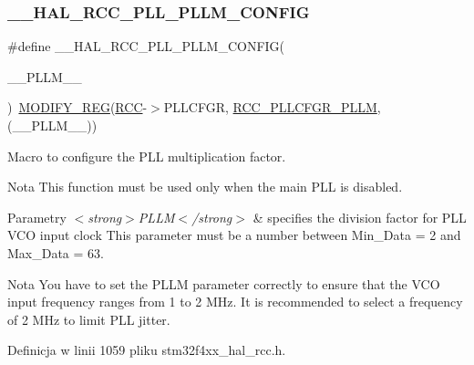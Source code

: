 \subsubsection{\texorpdfstring{\+\_\+\+\_\+\+H\+A\+L\+\_\+\+R\+C\+C\+\_\+\+P\+L\+L\+\_\+\+P\+L\+L\+M\+\_\+\+C\+O\+N\+F\+IG}{\_\_HAL\_RCC\_PLL\_PLLM\_CONFIG}}
{\footnotesize\ttfamily \#define \+\_\+\+\_\+\+H\+A\+L\+\_\+\+R\+C\+C\+\_\+\+P\+L\+L\+\_\+\+P\+L\+L\+M\+\_\+\+C\+O\+N\+F\+IG(\begin{DoxyParamCaption}\item[{}]{\+\_\+\+\_\+\+P\+L\+L\+M\+\_\+\+\_\+ }\end{DoxyParamCaption})~\hyperlink{group___exported__macro_ga6553c99f510c3bab8cc0a91602053247}{M\+O\+D\+I\+F\+Y\+\_\+\+R\+EG}(\hyperlink{group___peripheral__declaration_ga74944438a086975793d26ae48d5882d4}{R\+CC}-\/$>$P\+L\+L\+C\+F\+GR, \hyperlink{group___peripheral___registers___bits___definition_ga9a42e8b9ee60126976d9be056e5e66b1}{R\+C\+C\+\_\+\+P\+L\+L\+C\+F\+G\+R\+\_\+\+P\+L\+LM}, (\+\_\+\+\_\+\+P\+L\+L\+M\+\_\+\+\_\+))}



Macro to configure the P\+LL multiplication factor. 

\begin{DoxyNote}{Nota}
This function must be used only when the main P\+LL is disabled. 
\end{DoxyNote}

\begin{DoxyParams}{Parametry}
{\em $<$strong$>$\+P\+L\+L\+M$<$/strong$>$} & specifies the division factor for P\+LL V\+CO input clock This parameter must be a number between Min\+\_\+\+Data = 2 and Max\+\_\+\+Data = 63. \\
\hline
\end{DoxyParams}
\begin{DoxyNote}{Nota}
You have to set the P\+L\+LM parameter correctly to ensure that the V\+CO input frequency ranges from 1 to 2 M\+Hz. It is recommended to select a frequency of 2 M\+Hz to limit P\+LL jitter. 
\end{DoxyNote}


Definicja w linii 1059 pliku stm32f4xx\+\_\+hal\+\_\+rcc.\+h.

\mbox{\label{group___r_c_c___p_l_l___configuration_gaf9a8466f991888332ec978dc92c62d7d}} 
